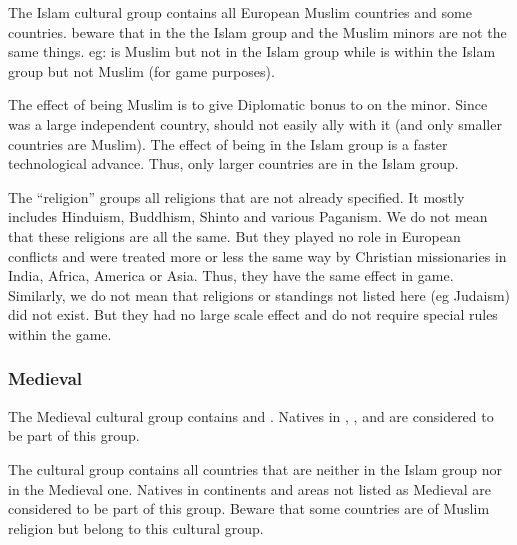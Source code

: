 \aparag The Islam cultural group contains all European Muslim countries and
some \ROTW countries.
\bparag beware that in the \ROTW the Islam group and the Muslim minors are not
the same things. eg: \paysGujerat is Muslim but not in the Islam group while
\paysMogol is within the Islam group but not Muslim (for game purposes).

\begin{designnote}
  The effect of being Muslim is to give Diplomatic bonus to \TUR on the
  minor. Since \paysMogol was a large independent country, \TUR should not
  easily ally with it (and only smaller \ROTW countries are Muslim). The
  effect of being in the Islam group is a faster technological advance. Thus,
  only larger \ROTW countries are in the Islam group.
\end{designnote}

\aparag The  ``religion'' groups all religions that are not
already specified.
\bparag It mostly includes Hinduism, Buddhism, Shinto and various Paganism.
\bparag We do not mean that these religions are all the same. But they played
no role in European conflicts and were treated more or less the same way by
Christian missionaries in India, Africa, America or Asia. Thus, they have the
same effect in game.
\bparag Similarly, we do not mean that religions or standings not listed here
(eg Judaism) did not exist. But they had no large scale effect and do not
require special rules within the game.


\subsubsection{Medieval}
\aparag The Medieval cultural group contains \paysInca and \paysAzteque.
\bparag Natives in %
\continentAfrica, \continentSiberia, \granderegionOceania and
\granderegionPacifique are considered to be part of this group.

\subsubsectionJ{\ROTW}{\techrotw}
\aparag The \ROTW cultural group contains all \ROTW countries that are neither
in the Islam group nor in the Medieval one.
\bparag Natives in continents and areas not listed as Medieval are considered
to be part of this group.
\bparag Beware that some \ROTW countries are of Muslim religion but belong to
this cultural group.


